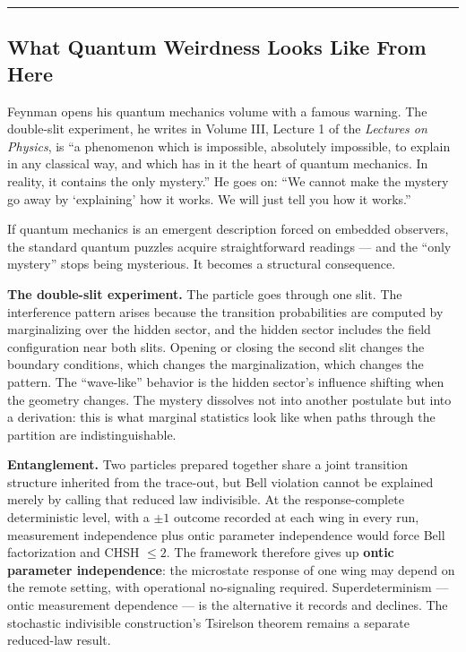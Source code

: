 \documentclass[
]{article}
\begin{document}
\begin{center}\rule{0.5\linewidth}{0.5pt}\end{center}

\hypertarget{what-quantum-weirdness-looks-like-from-here}{%
\subsection{What Quantum Weirdness Looks Like From
Here}\label{what-quantum-weirdness-looks-like-from-here}}

Feynman opens his quantum mechanics volume with a famous warning. The
double-slit experiment, he writes in Volume III, Lecture 1 of the
\emph{Lectures on Physics}, is ``a phenomenon which is impossible,
absolutely impossible, to explain in any classical way, and which has in
it the heart of quantum mechanics. In reality, it contains the only
mystery.'' He goes on: ``We cannot make the mystery go away by
`explaining' how it works. We will just tell you how it works.''

If quantum mechanics is an emergent description forced on embedded
observers, the standard quantum puzzles acquire straightforward readings
--- and the ``only mystery'' stops being mysterious. It becomes a
structural consequence.

\textbf{The double-slit experiment.} The particle goes through one slit.
The interference pattern arises because the transition probabilities are
computed by marginalizing over the hidden sector, and the hidden sector
includes the field configuration near both slits. Opening or closing the
second slit changes the boundary conditions, which changes the
marginalization, which changes the pattern. The ``wave-like'' behavior
is the hidden sector's influence shifting when the geometry changes. The
mystery dissolves not into another postulate but into a derivation: this
is what marginal statistics look like when paths through the partition
are indistinguishable.

\textbf{Entanglement.} Two particles prepared together share a joint
transition structure inherited from the trace-out, but Bell violation
cannot be explained merely by calling that reduced law indivisible. At
the response-complete deterministic level, with a \(\pm1\) outcome
recorded at each wing in every run, measurement independence plus ontic
parameter independence would force Bell factorization and CHSH \(\le2\).
The framework therefore gives up \textbf{ontic parameter independence}:
the microstate response of one wing may depend on the remote setting,
with operational no-signaling required. Superdeterminism --- ontic
measurement dependence --- is the alternative it records and declines.
The stochastic indivisible construction's Tsirelson theorem remains a
separate reduced-law result.
\end{document}
